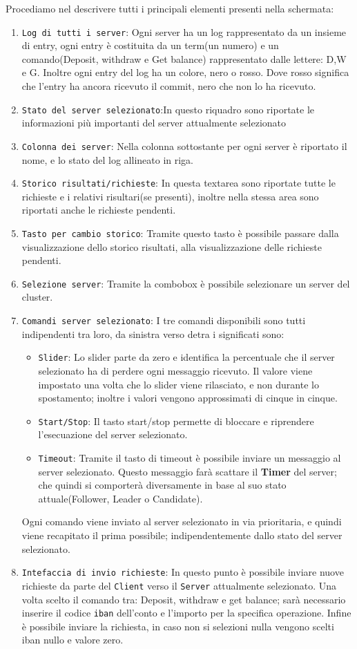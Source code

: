 Procediamo nel descrivere tutti i principali elementi presenti nella schermata:
\begin{enumerate}
	\item \texttt{Log di tutti i server}: Ogni server ha un log rappresentato da un insieme di entry, ogni entry è costituita da un term(un numero) e un comando(Deposit, withdraw e Get balance) rappresentato dalle lettere: D,W e G.
		Inoltre ogni entry del log ha un colore, nero o rosso.
		Dove rosso significa che l'entry ha ancora ricevuto il commit, nero che non lo ha ricevuto.
	\item \texttt{Stato del server selezionato}:In questo riquadro sono riportate le informazioni più importanti del server attualmente selezionato
	\item \texttt{Colonna dei server}: Nella colonna sottostante per ogni server è riportato il nome, e lo stato del log allineato in riga.
	\item \texttt{Storico risultati/richieste}: In questa textarea sono riportate tutte le richieste e i relativi risultari(se presenti), inoltre nella stessa area sono riportati anche le richieste pendenti.
	\item \texttt{Tasto per cambio storico}: Tramite questo tasto è possibile passare dalla visualizzazione dello storico risultati, alla visualizzazione delle richieste pendenti.
	\item \texttt{Selezione server}: Tramite la combobox è possibile selezionare un server del cluster.
	\item \texttt{Comandi server selezionato}:
		I tre comandi disponibili sono tutti indipendenti tra loro, da sinistra verso detra i significati sono:
		\begin{itemize}
			\item \texttt{Slider}: Lo slider parte da zero e identifica la percentuale che il server selezionato ha di perdere ogni messaggio ricevuto.
				Il valore viene impostato una volta che lo slider viene rilasciato, e non durante lo spostamento; inoltre i valori vengono approssimati di cinque in cinque.
			\item \texttt{Start/Stop}: Il tasto start/stop permette di bloccare e riprendere l'esecuazione del server selezionato. 
			\item \texttt{Timeout}: Tramite il tasto di timeout è possibile inviare un messaggio al server selezionato.
				Questo messaggio farà scattare il \textbf{Timer} del server; che quindi si comporterà diversamente in base al suo stato attuale(Follower, Leader o Candidate). 
		\end{itemize}
		Ogni comando viene inviato al server selezionato in via prioritaria, e quindi viene recapitato il prima possibile; indipendentemente dallo stato del server selezionato. 
	\item \texttt{Intefaccia di invio richieste}:
		In questo punto è possibile inviare nuove richieste da parte del \texttt{Client} verso il \texttt{Server} attualmente selezionato.
		Una volta scelto il comando tra: Deposit, withdraw e get balance; sarà necessario inserire il codice \texttt{iban} dell'conto e l'importo per la specifica operazione.
		Infine è possibile inviare la richiesta, in caso non si selezioni nulla vengono scelti iban nullo e valore zero.	
\end{enumerate}
